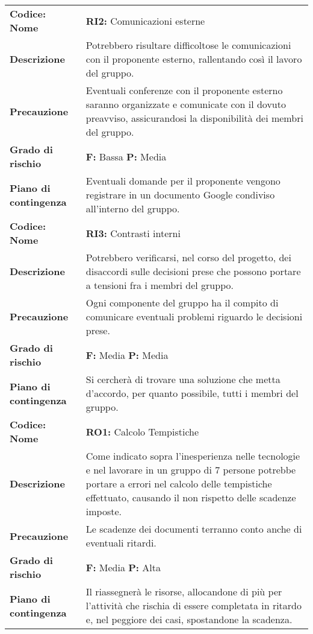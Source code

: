 {\begin{longtable}{C{3.5cm} | C{11cm}}
\textbf{Codice: Nome} & \textbf{RI2: }{Comunicazioni esterne}\\ 
\textbf{Descrizione} & Potrebbero risultare difficoltose le comunicazioni con il proponente esterno, rallentando così il lavoro del gruppo.\\ 
\textbf{Precauzione} & Eventuali conferenze con il proponente esterno saranno organizzate e comunicate con il dovuto preavviso, assicurandosi la disponibilità dei membri del gruppo.\\
\textbf{Grado di rischio} & \textbf{F: }Bassa \textbf{P: }Media\\
\textbf{Piano di contingenza} & Eventuali domande per il proponente vengono registrare in un documento Google condiviso all'interno del gruppo.\\
\hline

\textbf{Codice: Nome} & \textbf{RI3: }{Contrasti interni}\\ 
\textbf{Descrizione} & Potrebbero verificarsi, nel corso del progetto, dei disaccordi sulle decisioni prese che possono portare a tensioni fra i membri del gruppo.\\
\textbf{Precauzione} & Ogni componente del gruppo ha il compito di comunicare eventuali problemi riguardo le decisioni prese.\\
\textbf{Grado di rischio} & \textbf{F: }Media {\textbf{P: }}Media\\
\textbf{Piano di contingenza} & Si cercherà di trovare una soluzione che metta d'accordo, per quanto possibile, tutti i membri del gruppo.\\
\hline

\textbf{Codice: Nome} & \textbf{RO1: }{Calcolo Tempistiche}\\
\textbf{Descrizione} & Come indicato sopra l'inesperienza nelle tecnologie e nel lavorare in un gruppo di 7 persone potrebbe portare a errori nel calcolo delle tempistiche effettuato, causando il non rispetto delle scadenze imposte.\\
\textbf{Precauzione} & Le scadenze dei documenti terranno conto anche di eventuali ritardi.\\
\textbf{Grado di rischio} & \textbf{F: }Media \textbf{P: }Alta\\
\textbf{Piano di contingenza} & Il \respProg{} riassegnerà le risorse, allocandone di più per l'attività che rischia di essere completata in ritardo e, nel peggiore dei casi, spostandone la scadenza.\\
\hline


\end{longtable}}
